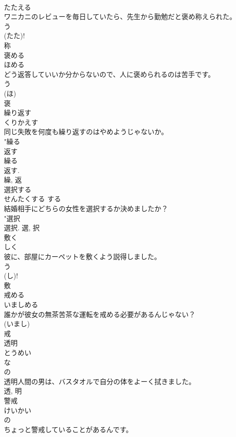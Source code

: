 \documentclass[8pt]{extreport}
\begin{document}
\begin{CJK}{UTF8}{min}
\\	たたえる	
\\	ワニカニのレビューを毎日していたら、先生から勤勉だと褒め称えられた。	
\\	う 
\\	(たた)! 
\\	称	
\\	褒める	
\\	ほめる	
\\	どう返答していいか分からないので、人に褒められるのは苦手です。	
\\	う 
\\	(ほ) 
\\	褒	
\\	繰り返す	
\\	くりかえす	
\\	同じ失敗を何度も繰り返すのはやめようじゃないか。	
\\	"繰る 
\\	返す 
\\	繰る 
\\	返す. 
\\	繰, 返	
\\	選択する	
\\	せんたくする	する 
\\	結婚相手にどちらの女性を選択するか決めましたか？	
\\	"選択 
\\	選択.	選, 択	
\\	敷く	
\\	しく	
\\	彼に、部屋にカーペットを敷くよう説得しました。	
\\	う 
\\	(し)! 
\\	敷	
\\	戒める	
\\	いましめる	
\\	誰かが彼女の無茶苦茶な運転を戒める必要があるんじゃない？	
\\	(いまし) 
\\	戒	
\\	透明	
\\	とうめい	
\\	な 
\\	の 
\\	透明人間の男は、バスタオルで自分の体をよーく拭きました。	
\\	透, 明	
\\	警戒	
\\	けいかい	
\\	の 
\\	ちょっと警戒していることがあるんです。	

\end{CJK}
\end{document}
